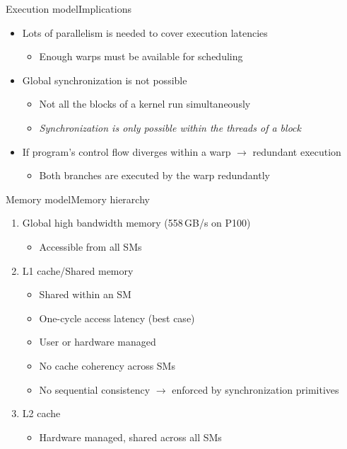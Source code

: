 \documentclass[aspectratio=169,12pt]{beamer}
\begin{document}
\begin{frame}{Execution model}{Implications}
  \begin{itemize}
  \item Lots of parallelism is needed to cover execution latencies
    \begin{itemize}
    \item Enough warps must be available for scheduling
    \end{itemize}
    \vfill
  \item Global synchronization is not possible
    \begin{itemize}
    \item Not all the blocks of a kernel run simultaneously
    \item \emph{Synchronization is only possible within the threads of a block}
    \end{itemize}
    \vfill
  \item If program's control flow diverges within a warp $\rightarrow$ redundant execution
    \begin{itemize}
    \item Both branches are executed by the warp redundantly
    \end{itemize}
  \end{itemize}
\end{frame}


\begin{frame}{Memory model}{Memory hierarchy}
  \begin{enumerate}
  \item Global high bandwidth memory (558\,GB/s on P100)
    \begin{itemize}
    \item Accessible from all SMs
    \end{itemize}
  \item L1 cache/Shared memory
    \begin{itemize}
    \item Shared within an SM
    \item One-cycle access latency (best case)
    \item User or hardware managed
    \item No cache coherency across SMs
    \item No sequential consistency $\rightarrow$ enforced by synchronization primitives
    \end{itemize}
  \item L2 cache
    \begin{itemize}
    \item Hardware managed, shared across all SMs
    \end{itemize}
  \end{enumerate}
\end{frame}
\end{document}
